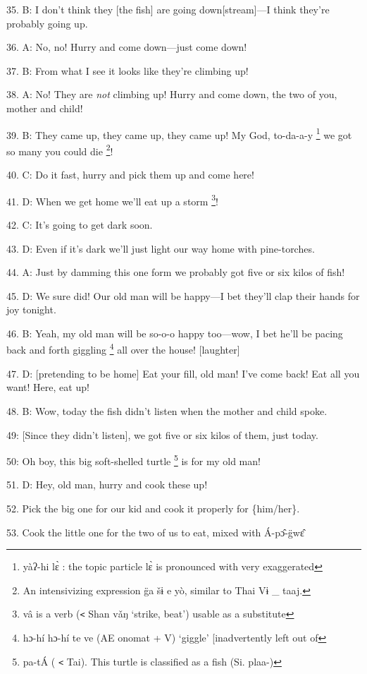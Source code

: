 35. B: I don't think they [the fish] are going down[stream]---I think they're probably
going up.

36. A: No, no! Hurry and come down---just come down!

37. B: From what I see it looks like they're climbing up!

38. A: No! They are \textit{not} climbing up! Hurry and come down, the two of you,
mother and child!

39. B: They came up, they came up, they came up! My God, to-da-a-y \footnote{yàʔ-hi lɛ̀ : the topic particle lɛ̀ is pronounced with very exaggerated} we got
so many you could die \footnote{An intensivizing expression g̈a  šɨ  e  yò, similar to Thai Vɨ \_ taaj.}!

40. C: Do it fast, hurry and pick them up and come here!

41. D: When we get home we'll eat up a storm \footnote{vâ is a verb (\texttt{<} Shan vǎŋ `strike, beat') usable as a substitute}!

42. C: It's going to get dark soon.

43. D: Even if it's dark we'll just light our way home with pine-torches.

44. A: Just by damming this one form we probably got five or six kilos of fish!

45. D: We sure did! Our old man will be happy---I bet they'll clap their hands
for joy tonight.

46. B: Yeah, my old man will be so-o-o happy too---wow, I bet he'll be pacing back
and forth giggling \footnote{hɔ-hí hɔ-hí te ve (AE onomat + V) `giggle' [inadvertently left out of} all over the house! [laughter]

47. D: [pretending to be home] Eat your fill, old man! I've come back! Eat all
you want! Here, eat up!

48. B: Wow, today the fish didn't listen when the mother and child spoke.

49: [Since they didn't listen], we got five or six kilos of them, just today.

50: Oh boy, this big soft-shelled turtle \footnote{pa-tÁ ( \texttt{<} Tai). This turtle is classified as a fish (Si. plaa-)} is for my old man!

51. D: Hey, old man, hurry and cook these up!

52. Pick the big one for our kid and cook it properly for \{him/her\}.

53. Cook the little one for the two of us to eat, mixed with Á-pɔ̂-g̈wɛ̂
